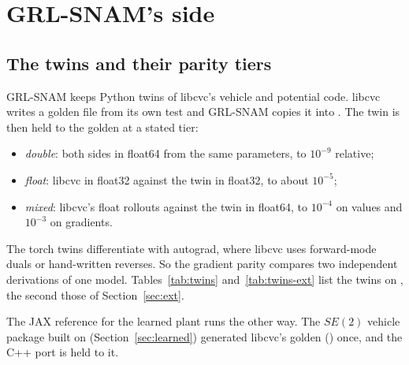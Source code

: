 \documentclass[11pt]{article}
\theoremstyle{remark}
\begin{document}
\section{GRL-SNAM's side}
\label{sec:grl}

\subsection{The twins and their parity tiers}
GRL-SNAM keeps Python twins of libcvc's vehicle and potential code. libcvc writes a golden file
from its own test and GRL-SNAM copies it into . The twin is then held to the
golden at a stated tier:
\begin{itemize}
  \item \emph{double}: both sides in float64 from the same parameters, to $10^{-9}$ relative;
  \item \emph{float}: libcvc in float32 against the twin in float32, to about $10^{-5}$;
  \item \emph{mixed}: libcvc's float rollouts against the twin in float64, to $10^{-4}$ on values and
        $10^{-3}$ on gradients.
\end{itemize}
The torch twins differentiate with autograd, where libcvc uses forward-mode duals or hand-written
reverses. So the gradient parity compares two independent derivations of one model.
Tables~\ref{tab:twins} and~\ref{tab:twins-ext} list the twins on , the second those of
Section~\ref{sec:ext}.

The JAX reference for the learned plant runs the other way. The $SE(2)$ vehicle package built on
 (Section~\ref{sec:learned}) generated libcvc's golden
() once, and the C++ port is held to it.
\end{document}
